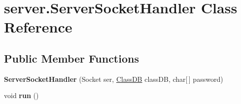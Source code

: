 \hypertarget{classserver_1_1_server_socket_handler}{
\section{server.\-Server\-Socket\-Handler \-Class \-Reference}
\label{classserver_1_1_server_socket_handler}
}
\subsection*{\-Public \-Member \-Functions}
\begin{DoxyCompactItemize}
\item 
\hypertarget{classserver_1_1_server_socket_handler_af5269e3ab94dfd7a6b2cd9b3798aa6d1}{
{\bfseries \-Server\-Socket\-Handler} (\-Socket ser, \hyperlink{classstorage_1_1_class_d_b}{\-Class\-D\-B} class\-D\-B, char\mbox{[}$\,$\mbox{]} password)}
\label{classserver_1_1_server_socket_handler_af5269e3ab94dfd7a6b2cd9b3798aa6d1}

\item 
\hypertarget{classserver_1_1_server_socket_handler_af68dfa5f0d8b1929fb9eb821e2ad4272}{
void {\bfseries run} ()}
\label{classserver_1_1_server_socket_handler_af68dfa5f0d8b1929fb9eb821e2ad4272}

\end{DoxyCompactItemize}
